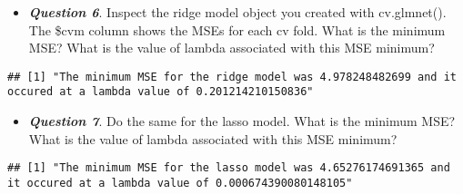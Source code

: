 \documentclass[
]{article}
\newenvironment{Shaded}{\begin{snugshade}}{\end{snugshade}}
\newcommand{\FunctionTok}[1]{\textcolor[rgb]{0.00,0.00,0.00}{#1}}
\newcommand{\NormalTok}[1]{#1}
\newcommand{\SpecialCharTok}[1]{\textcolor[rgb]{0.00,0.00,0.00}{#1}}
\newcommand{\StringTok}[1]{\textcolor[rgb]{0.31,0.60,0.02}{#1}}
\providecommand{\tightlist}{%
  \setlength{\itemsep}{0pt}\setlength{\parskip}{0pt}}
\begin{document}
\begin{itemize}
\tightlist
\item
  \textbf{\emph{Question 6}}. Inspect the ridge model object you created
  with cv.glmnet(). The \$cvm column shows the MSEs for each cv fold.
  What is the minimum MSE? What is the value of lambda associated with
  this MSE minimum?
\end{itemize}

\begin{Shaded}
\end{Shaded}

\begin{verbatim}
## [1] "The minimum MSE for the ridge model was 4.978248482699 and it occured at a lambda value of 0.201214210150836"
\end{verbatim}

\begin{itemize}
\tightlist
\item
  \textbf{\emph{Question 7}}. Do the same for the lasso model. What is
  the minimum MSE? What is the value of lambda associated with this MSE
  minimum?
\end{itemize}

\begin{Shaded}
\end{Shaded}

\begin{verbatim}
## [1] "The minimum MSE for the lasso model was 4.65276174691365 and it occured at a lambda value of 0.000674390080148105"
\end{verbatim}
\end{document}
